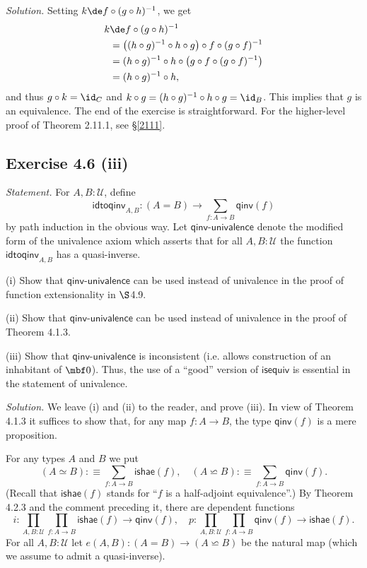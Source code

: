 \documentclass[12pt]{article}
\begin{document}
\nn\emph{Solution.} Setting $k\de f\circ (g\circ h)^{-1}$, we get 
\begin{align*}
k&\de f\circ (g\circ h)^{-1}\\
&=\big((h\circ g)^{-1}\circ h\circ g\big)\circ f\circ (g\circ f)^{-1}\\
&=(h\circ g)^{-1}\circ h\circ\big(g\circ f\circ (g\circ f)^{-1}\big)\\
&=(h\circ g)^{-1}\circ h,
\end{align*}
and thus $g\circ k=\id_C$ and $k\circ g=(h\circ g)^{-1}\circ h\circ g=\id_B$. This implies that $g$ is an equivalence. The end of the exercise is straightforward. For the higher-level proof of Theorem 2.11.1, see \S\ref{2111}.


\subsection{Exercise 4.6 (iii)}

\emph{Statement.} For $A,B:\mathcal U$, define
$$
\mathsf{idtoqinv}_{A,B}:(A=B)\to\sum_{f:A\to B}\mathsf{qinv}(f)
$$
by path induction in the obvious way. Let $\mathsf{qinv}$-$\mathsf{univalence}$ denote the modified form of the univalence axiom which asserts that for all $A,B:\mathcal U$ the function $\mathsf{idtoqinv}_{A,B}$ has a quasi-inverse.

\nn(i) Show that $\mathsf{qinv}$-$\mathsf{univalence}$ can be used instead of univalence in the proof of function extensionality in $\S$4.9.

\nn(ii) Show that $\mathsf{qinv}$-$\mathsf{univalence}$ can be used instead of univalence in the proof of Theorem 4.1.3.

\nn(iii) Show that $\mathsf{qinv}$-$\mathsf{univalence}$ is inconsistent (i.e. allows construction of an inhabitant of $\mbf0$). Thus, the use of a ``good'' version of $\mathsf{isequiv}$ is essential in the statement of univalence.

\nn\emph{Solution.} We leave (i) and (ii) to the reader, and prove (iii). In view of Theorem 4.1.3 it suffices to show that, for any map $f:A\to B$, the type $\mathsf{qinv}(f)$ is a mere proposition. 

For any types $A$ and $B$ we put 
$$
(A\simeq B):\equiv\sum_{f:A\to B}\mathsf{ishae}(f),\quad(A\backsimeq B):\equiv\sum_{f:A\to B}\mathsf{qinv}(f).
$$ 
(Recall that $\mathsf{ishae}(f)$ stands for ``$f$ is a half-adjoint equivalence''.) By Theorem 4.2.3 and the comment preceding it, there are dependent functions 
$$
i:\prod_{A,B:\mathcal U}\prod_{f:A\to B}\mathsf{ishae}(f)\to\mathsf{qinv}(f),\quad p:\prod_{A,B:\mathcal U}\prod_{f:A\to B}\mathsf{qinv}(f)\to\mathsf{ishae}(f).
$$ 
For all $A,B:\mathcal U$ let $e(A,B):(A=B)\to(A\backsimeq B)$ be the natural map (which we assume to admit a quasi-inverse).
\end{document}
